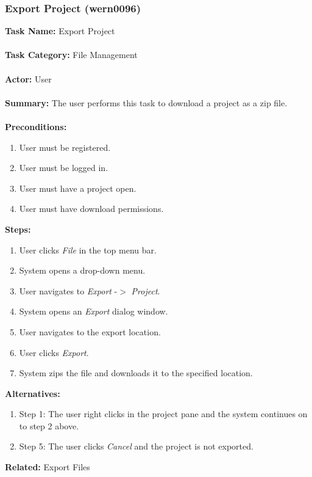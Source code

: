 \documentclass[11pt]{report}
\begin{document}
\newpage

\subsubsection{Export Project (wern0096)}
\begin{framed}
	\noindent\textbf{Task Name:} Export Project \\ \\
	\textbf{Task Category:} File Management \\ \\
	\textbf{Actor:} User \\ \\
	\textbf{Summary:} The user performs this task to download a project as a zip file. \\ \\
	\textbf{Preconditions:} 
	\begin{enumerate}
		\item User must be registered.
		\item User must be logged in.
		\item User must have a project open.
		\item User must have download permissions.
	\end{enumerate}
	\textbf{Steps:}
	\begin{enumerate}
		\item User clicks \textit{File} in the top menu bar.
		\item System opens a drop-down menu.
		\item User navigates to \textit{Export} -$>$ \textit{Project}.
		\item System opens an \textit{Export} dialog window.
		\item User navigates to the export location.
		\item User clicks \textit{Export}.
		\item System zips the file and downloads it to the specified location.
	\end{enumerate}
	\textbf{Alternatives:} 
	\begin{enumerate}
		\item Step 1: The user right clicks in the project pane and the system continues on to step 2 above.
		\item Step 5: The user clicks \textit{Cancel} and the project is not exported.
	\end{enumerate}
	\textbf{Related:} Export Files
\end{framed}
\end{document}
